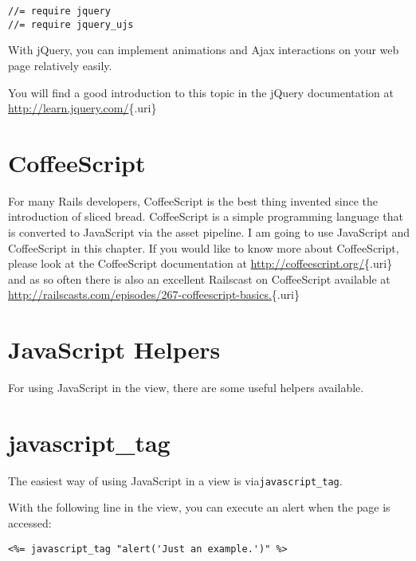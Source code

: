 \documentclass[a4paper]{book}
\begin{document}
\begin{shaded}\begin{verbatim}
//= require jquery
//= require jquery_ujs
\end{verbatim}\end{shaded}

With jQuery, you can implement animations and Ajax interactions on your web page relatively easily.

You will find a good introduction to this topic in the jQuery documentation at \url{http://learn.jquery.com/}\{.uri\}

\section{CoffeeScript}\label{coffeescript}

For many Rails developers, CoffeeScript is the best thing invented since the introduction of sliced bread. CoffeeScript is a simple programming language that is converted to JavaScript via the asset pipeline. I am going to use JavaScript and CoffeeScript in this chapter. If you would like to know more about CoffeeScript, please look at the CoffeeScript documentation at \url{http://coffeescript.org/}\{.uri\} and as so often there is also an excellent Railscast on CoffeeScript available at \url{http://railscasts.com/episodes/267-coffeescript-basics.}\{.uri\}

\section{JavaScript Helpers}\label{javascript-helpers}

For using JavaScript in the view, there are some useful helpers available.

\section{javascript\_tag}\label{javascriptux5ftag}

The easiest way of using JavaScript in a view is via\texttt{javascript\_tag}.

With the following line in the view, you can execute an alert when the page is accessed:

\begin{shaded}\begin{verbatim}
<%= javascript_tag "alert('Just an example.')" %>
\end{verbatim}\end{shaded}
\end{document}
